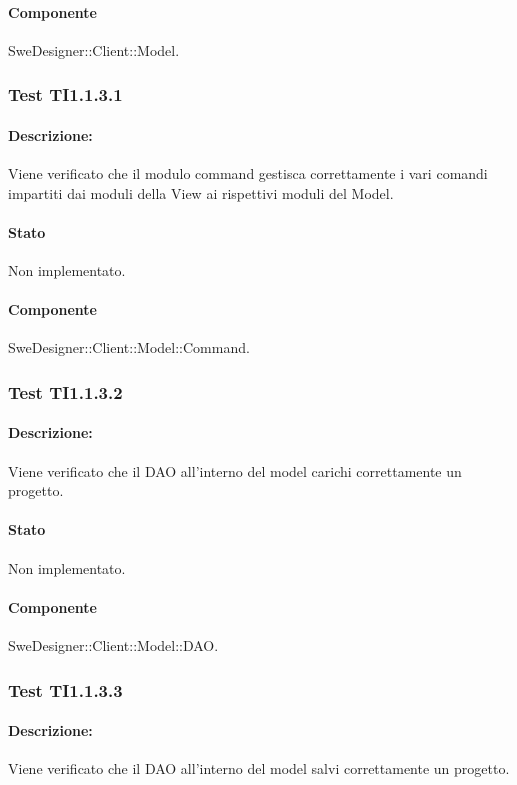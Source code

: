 \documentclass[../PianoDiQualifica.tex]{subfiles}
\begin{document}
	\paragraph{Componente} SweDesigner::Client::Model.
	
	\subsubsection{Test TI1.1.3.1}
	\paragraph{Descrizione:} Viene verificato che il modulo command gestisca correttamente i vari comandi impartiti dai moduli della View ai rispettivi moduli del Model.
	\paragraph{Stato} Non implementato.
	\paragraph{Componente} SweDesigner::Client::Model::Command.
	
	\subsubsection{Test TI1.1.3.2}
	\paragraph{Descrizione:} Viene verificato che il DAO all'interno del model carichi correttamente un progetto.
	\paragraph{Stato} Non implementato.
	\paragraph{Componente} SweDesigner::Client::Model::DAO.
	
	\subsubsection{Test TI1.1.3.3}
	\paragraph{Descrizione:} Viene verificato che il DAO all'interno del model salvi correttamente un progetto.
\end{document}
